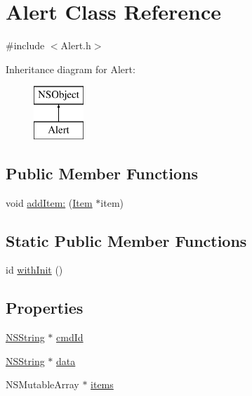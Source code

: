 \hypertarget{interface_alert}{
\section{\-Alert \-Class \-Reference}
\label{interface_alert}
}


{\ttfamily \#include $<$\-Alert.\-h$>$}

\-Inheritance diagram for \-Alert\-:\begin{figure}[H]
\begin{center}
\leavevmode
\includegraphics[height=2.000000cm]{interface_alert}
\end{center}
\end{figure}
\subsection*{\-Public \-Member \-Functions}
\begin{DoxyCompactItemize}
\item 
void \hyperlink{interface_alert_a1e4592df5e8f12a9ddb5ba9dc8733202}{add\-Item\-:} (\hyperlink{interface_item}{\-Item} $\ast$item)
\end{DoxyCompactItemize}
\subsection*{\-Static \-Public \-Member \-Functions}
\begin{DoxyCompactItemize}
\item 
id \hyperlink{interface_alert_a32adbb6a2f8a562ea105c8b9eccd6afd}{with\-Init} ()
\end{DoxyCompactItemize}
\subsection*{\-Properties}
\begin{DoxyCompactItemize}
\item 
\hyperlink{class_n_s_string}{\-N\-S\-String} $\ast$ \hyperlink{interface_alert_af1a14c340c81492b37dcb9df0c5ae328}{cmd\-Id}
\item 
\hyperlink{class_n_s_string}{\-N\-S\-String} $\ast$ \hyperlink{interface_alert_a5dfd8afa627ed7494584f18d96b88d3a}{data}
\item 
\-N\-S\-Mutable\-Array $\ast$ \hyperlink{interface_alert_a307ae58151e1590ab60f5b61fb49b0f7}{items}
\end{DoxyCompactItemize}


